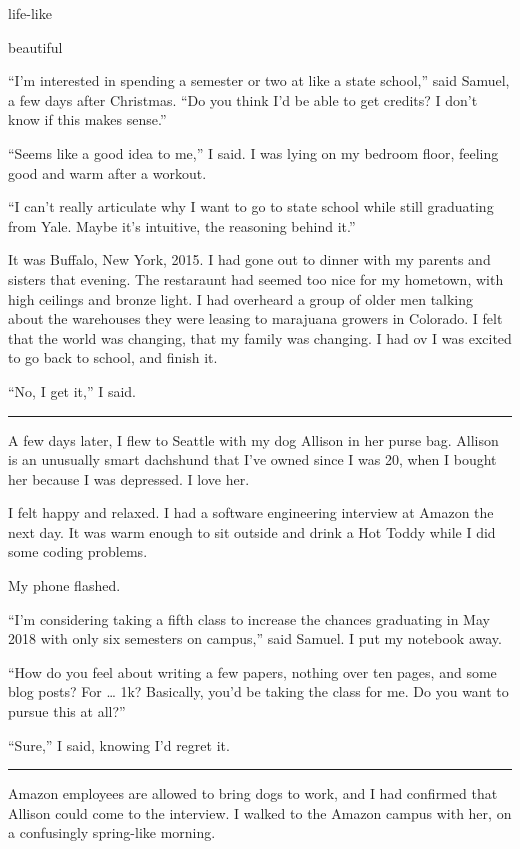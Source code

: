 life-like

beautiful

``I'm interested in spending a semester or two at like a state school,'' said
Samuel, a few days after Christmas.  ``Do you think I'd be able to get credits?
I don't know if this makes sense.''

``Seems like a good idea to me,'' I said.  I was lying on my bedroom floor,
feeling good and warm after a workout.

``I can't really articulate why I want to go to state school while still
graduating from Yale.   Maybe it's intuitive, the reasoning behind it.'' 

It was Buffalo, New York, 2015.  I had gone out to dinner with my parents and
sisters that evening.  The restaraunt had seemed too nice for my hometown, with
high ceilings and bronze light.  I had overheard a group of older men talking
about the warehouses they were leasing to marajuana growers in Colorado.  I felt
that the world was changing, that my family was changing.  I had ov  I was
excited to go back to school, and finish it. 

``No, I get it,'' I said.

\fancybreak{* * *}

A few days later, I flew to Seattle with my dog Allison in her purse bag.
Allison is an unusually smart dachshund that I've owned since I was 20, when I
bought her because I was depressed.  I love her.  

I felt happy and relaxed.  I had a software engineering interview at Amazon the
next day.   It was warm enough to sit outside and drink a Hot Toddy while I did
some coding problems. 

My phone flashed.

``I'm considering taking a fifth class to increase the chances graduating in May
2018 with only six semesters on campus,'' said Samuel.  I put my notebook away.

``How do you feel about writing a few papers, nothing over ten pages,
and some blog posts?  For … 1k?  Basically, you'd be taking the class for me.
Do you want to pursue this at all?'' 

``Sure,'' I said, knowing I'd regret it.

\fancybreak{* * *}

Amazon employees are allowed to bring dogs to work, and I had confirmed that
Allison could come to the interview.  I walked to the Amazon campus with
her, on a confusingly spring-like morning. 

